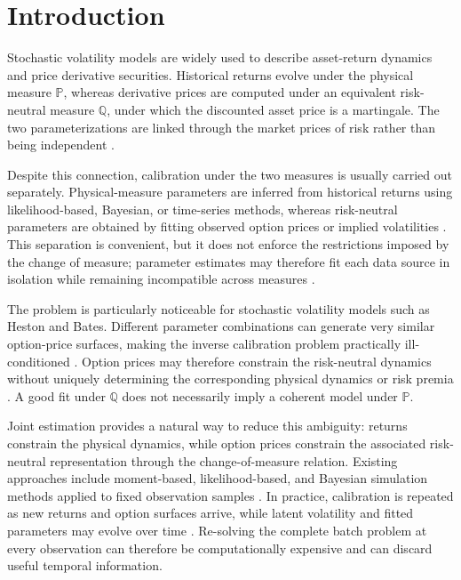 \documentclass[sigconf,anonymous,review]{acmart}
\begin{document}
\section{Introduction}
Stochastic volatility models are widely used to describe asset-return dynamics and price derivative securities. Historical returns evolve under the physical measure $\mathbb{P}$, whereas derivative prices are computed under an equivalent risk-neutral measure $\mathbb{Q}$, under which the discounted asset price is a martingale. The two parameterizations are linked through the market prices of risk rather than being independent \cite{heston1993,bates1996,shreve2004}.

Despite this connection, calibration under the two measures is usually carried out separately. Physical-measure parameters are inferred from historical returns using likelihood-based, Bayesian, or time-series methods, whereas risk-neutral parameters are obtained by fitting observed option prices or implied volatilities \cite{fruehwirth2008,stramer2011bayesian,cui2017full,mrazek2017calibration}. This separation is convenient, but it does not enforce the restrictions imposed by the change of measure; parameter estimates may therefore fit each data source in isolation while remaining incompatible across measures \cite{chernov2000joint,pan2002jump}.

The problem is particularly noticeable for stochastic volatility models such as Heston and Bates. Different parameter combinations can generate very similar option-price surfaces, making the inverse calibration problem practically ill-conditioned \cite{gatheral2006,cui2017full,mrazek2017calibration}. Option prices may therefore constrain the risk-neutral dynamics without uniquely determining the corresponding physical dynamics or risk premia \cite{chernov2000joint,forbes2007inference,hurn2015estimating}. A good fit under $\mathbb{Q}$ does not necessarily imply a coherent model under $\mathbb{P}$.

Joint estimation provides a natural way to reduce this ambiguity: returns constrain the physical dynamics, while option prices constrain the associated risk-neutral representation through the change-of-measure relation. Existing approaches include moment-based, likelihood-based, and Bayesian simulation methods applied to fixed observation samples \cite{chernov2000joint,pan2002jump,forbes2007inference,hurn2015estimating}. In practice, calibration is repeated as new returns and option surfaces arrive, while latent volatility and fitted parameters may evolve over time \cite{lindstrom2008sequential}. Re-solving the complete batch problem at every observation can therefore be computationally expensive and can discard useful temporal information.
\end{document}
